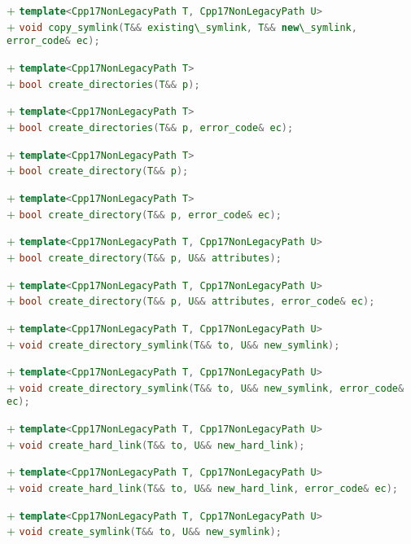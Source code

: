 \documentclass[11pt]{article}
\newcommand{\code}[2][cpp]{\lstinline[language=#1,basicstyle=\small\ttfamily]{#2}}
\newcommand{\tsreplace}[3]{\textcolor{red}{\sout{#1}}#2\textcolor{darkgreen}{#3}}
\begin{document}
\tsreplace{}{}{+ \code{template<Cpp17NonLegacyPath T, Cpp17NonLegacyPath U>}}\\
\tsreplace{}{}{+ \code{void copy_symlink(T&& existing\_symlink, T&& new\_symlink, error_code& ec);}}

\tsreplace{}{}{+ \code{template<Cpp17NonLegacyPath T>}}\\
\tsreplace{}{}{+ \code{bool create_directories(T&& p);}}

\tsreplace{}{}{+ \code{template<Cpp17NonLegacyPath T>}}\\
\tsreplace{}{}{+ \code{bool create_directories(T&& p, error_code& ec);}}

\tsreplace{}{}{+ \code{template<Cpp17NonLegacyPath T>}}\\
\tsreplace{}{}{+ \code{bool create_directory(T&& p);}}

\tsreplace{}{}{+ \code{template<Cpp17NonLegacyPath T>}}\\
\tsreplace{}{}{+ \code{bool create_directory(T&& p, error_code& ec);}}

\tsreplace{}{}{+ \code{template<Cpp17NonLegacyPath T, Cpp17NonLegacyPath U>}}\\
\tsreplace{}{}{+ \code{bool create_directory(T&& p, U&& attributes);}}

\tsreplace{}{}{+ \code{template<Cpp17NonLegacyPath T, Cpp17NonLegacyPath U>}}\\
\tsreplace{}{}{+ \code{bool create_directory(T&& p, U&& attributes, error_code& ec);}}

\tsreplace{}{}{+ \code{template<Cpp17NonLegacyPath T, Cpp17NonLegacyPath U>}}\\
\tsreplace{}{}{+ \code{void create_directory_symlink(T&& to, U&& new_symlink);}}

\tsreplace{}{}{+ \code{template<Cpp17NonLegacyPath T, Cpp17NonLegacyPath U>}}\\
\tsreplace{}{}{+ \code{void create_directory_symlink(T&& to, U&& new_symlink, error_code& ec);}}

\tsreplace{}{}{+ \code{template<Cpp17NonLegacyPath T, Cpp17NonLegacyPath U>}}\\
\tsreplace{}{}{+ \code{void create_hard_link(T&& to, U&& new_hard_link);}}

\tsreplace{}{}{+ \code{template<Cpp17NonLegacyPath T, Cpp17NonLegacyPath U>}}\\
\tsreplace{}{}{+ \code{void create_hard_link(T&& to, U&& new_hard_link, error_code& ec);}}

\tsreplace{}{}{+ \code{template<Cpp17NonLegacyPath T, Cpp17NonLegacyPath U>}}\\
\tsreplace{}{}{+ \code{void create_symlink(T&& to, U&& new_symlink);}}
\end{document}
